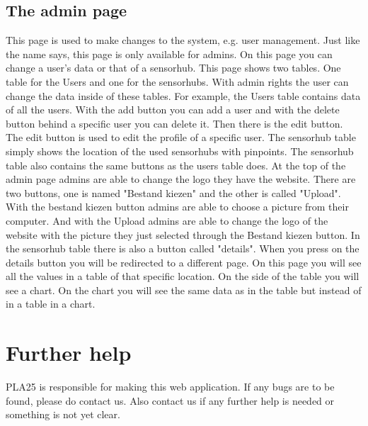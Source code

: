 \documentclass[a4paper]{article}
\begin{document}
\subsection{The admin page}
This page is used to make changes to the system, e.g. user management. Just like the name says, this page is only available for admins. On this page you can change a user's data or that of a sensorhub.
\newline
This page shows two tables. One table for the Users and one for the sensorhubs. With admin rights the user can change the data inside of these tables.
\newline
For example, the Users table contains data of all the users. With the add button you can add a user and with the delete button behind a specific user you can delete it. Then there is the edit button. The edit button is used to edit the profile of a specific user.
\newline
The sensorhub table simply shows the location of the used sensorhubs with pinpoints. The sensorhub table also contains the same buttons as the users table does.
\newline
At the top of the admin page admins are able to change the logo they have the website. There are two buttons, one is named "Bestand kiezen" and the other is called "Upload".  With the bestand kiezen button admins are able to choose a picture from their computer. And with the Upload admins are able to change the logo of the website with the picture they just selected through the Bestand kiezen button.
\newline
In the sensorhub table there is also a button called "details". When you press on the details button you will be redirected to a different page. On this page you will see all the values in a table of that specific location. On the side of the table you will see a chart. On the chart you will see the same data as in the table but instead of in a table in a chart.

\pagebreak

\section{Further help}
PLA25 is responsible for making this web application. If any bugs are to be found, please do contact us.
Also contact us if any further help is needed or something is not yet clear.
\end{document}
